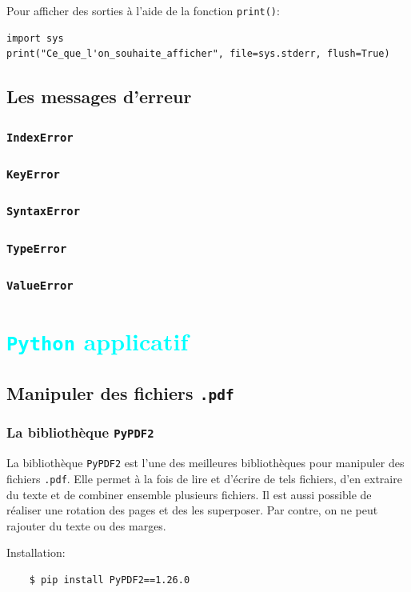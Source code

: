 \documentclass[a4paper,11pt]{book}
\begin{document}
Pour afficher des sorties à l'aide de la fonction \texttt{print()}:
\begin{lstlisting}
import sys
print("Ce_que_l'on_souhaite_afficher", file=sys.stderr, flush=True)
\end{lstlisting}
\medskip

\chapter{Les messages d'erreur}


\section{\texttt{IndexError}}
\section{\texttt{KeyError}}
\section{\texttt{SyntaxError}}
\section{\texttt{TypeError}}
\section{\texttt{ValueError}}
\medskip

\part{\textcolor{cyan}{\texttt{Python} applicatif}}
\chapter{Manipuler des fichiers \texttt{.pdf}}
\section{La bibliothèque \texttt{PyPDF2}}
La bibliothèque \texttt{PyPDF2} est l'une des meilleures bibliothèques pour manipuler des fichiers \texttt{.pdf}. Elle permet à la fois de lire et d'écrire de tels fichiers, d'en extraire du texte et de combiner ensemble plusieurs fichiers. Il est aussi possible de réaliser une rotation des pages et des les superposer. Par contre, on ne peut rajouter du texte ou des marges.
\medskip

Installation:
\begin{verbatim}
    $ pip install PyPDF2==1.26.0
\end{verbatim}
\medskip
\end{document}
